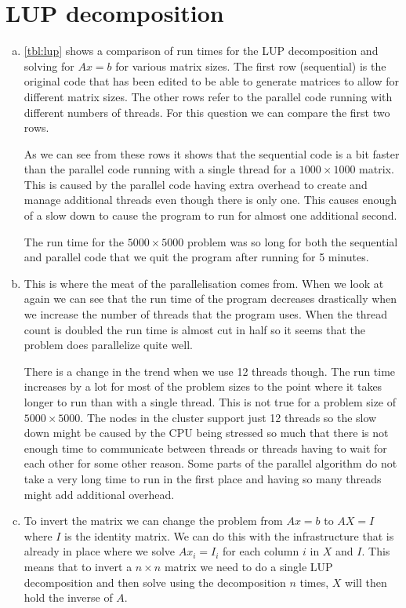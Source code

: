 \documentclass[a4paper]{article}
\begin{document}
\section{LUP decomposition}
\begin{enumerate}[(a)]
	\item \autoref{tbl:lup} shows a comparison of run times for the LUP decomposition and solving for $Ax=b$ for various matrix sizes. The first row (sequential) is the original code that has been edited to be able to generate matrices to allow for different matrix sizes. The other rows refer to the parallel code running with different numbers of threads. For this question we can compare the first two rows.
	
	As we can see from these rows it shows that the sequential code is a bit faster than the parallel code running with a single thread for a $1000 \times 1000$ matrix. This is caused by the parallel code having extra overhead to create and manage additional threads even though there is only one. This causes enough of a slow down to cause the program to run for almost one additional second.
	
	The run time for the $5000 \times 5000$ problem was so long for both the sequential and parallel code that we quit the program after running for 5 minutes.
	
	\item This is where the meat of the parallelisation comes from. When we look at  again we can see that the run time of the program decreases drastically when we increase the number of threads that the program uses. When the thread count is doubled the run time is almost cut in half so it seems that the problem does parallelize quite well.
	
	There is a change in the trend when we use 12 threads though. The run time increases by a lot for most of the problem sizes to the point where it takes longer to run than with a single thread. This is not true for a problem size of $5000 \times 5000$. The nodes in the cluster support just 12 threads so the slow down might be caused by the CPU being stressed so much that there is not enough time to communicate between threads or threads having to wait for each other for some other reason. Some parts of the parallel algorithm do not take a very long time to run in the first place and having so many threads might add additional overhead.

	\item To invert the matrix we can change the problem from $Ax=b$ to $AX=I$ where $I$ is the identity matrix. We can do this with the infrastructure that is already in place where we solve $Ax_i = I_i$ for each column $i$ in $X$ and $I$. This means that to invert a $n \times n$ matrix we need to do a single LUP decomposition and then solve using the decomposition $n$ times, $X$ will then hold the inverse of $A$.
	

\end{enumerate}
\end{document}
